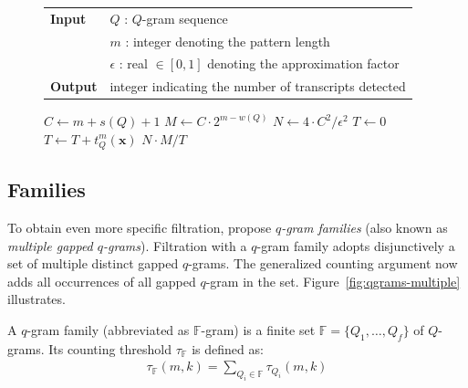 \begin{figure}[b]
\begin{center}
\begin{minipage}[t]{.8\textwidth}
\begin{algorithm}[H]
\begin{tabular}{ll}
\textbf{Input}  & $Q$ : $Q$-gram sequence\\
				& $m$ : integer denoting the pattern length\\
				& $\epsilon$ : real $\in [0,1]$ denoting the approximation factor\\
\textbf{Output} & integer indicating the number of transcripts detected\\
\end{tabular}
\begin{algorithmic}[1]
\State $C \gets m+s(Q)+1$
\State $M \gets C \cdot 2^{m-w(Q)}$
\State $N \gets 4 \cdot C^2 / \epsilon^2$
\State $T \gets 0$
\Repeat
	\EndFor
	\State $T \gets T + t_Q^m(\mathbf{x})$
\State \Return $N \cdot M / T$
\end{algorithmic}
\label{alg:qgram-specificity}
\end{algorithm}
\end{minipage}
\end{center}
\end{figure}


\subsection{Families}

To obtain even more specific filtration, \cite{Kucherov2005} propose \emph{$q$-gram families} (also known as \emph{multiple gapped $q$-grams}).
Filtration with a $q$-gram family adopts disjunctively a set of multiple distinct gapped $q$-grams.
The generalized counting argument now adds all occurrences of all gapped $q$-gram in the set.
Figure~\ref{fig:qgrams-multiple} illustrates.
\begin{definition}
A $q$-gram family (abbreviated as $\mathbb{F}$-gram) is a finite set $\mathbb{F} = \{ Q_1, \dots, Q_f \}$ of $Q$-grams.
Its counting threshold $\tau_{\mathbb{F}}$ is defined as:
\begin{eqnarray}
\tau_{\mathbb{F}}(m,k) = \sum_{Q_i \in \mathbb{F}}{\tau_{Q_i}(m,k)}
\end{eqnarray}
\end{definition}

